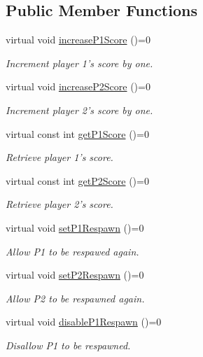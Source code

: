 \subsection*{Public Member Functions}
\begin{DoxyCompactItemize}
\item 
virtual void \hyperlink{classGameStateData_a28ec2cf2d7dd89bab394b611a83e7d4c}{increase\-P1\-Score} ()=0
\begin{DoxyCompactList}\small\item\em Increment player 1's score by one. \end{DoxyCompactList}\item 
virtual void \hyperlink{classGameStateData_a8b2470bafedd2c51cdc32199ae004b13}{increase\-P2\-Score} ()=0
\begin{DoxyCompactList}\small\item\em Increment player 2's score by one. \end{DoxyCompactList}\item 
virtual const int \hyperlink{classGameStateData_ac4dbf8f19eb4abae6c6e674e1f0ad473}{get\-P1\-Score} ()=0
\begin{DoxyCompactList}\small\item\em Retrieve player 1's score. \end{DoxyCompactList}\item 
virtual const int \hyperlink{classGameStateData_a024affaa547433a0feca091d2bc516b6}{get\-P2\-Score} ()=0
\begin{DoxyCompactList}\small\item\em Retrieve player 2's score. \end{DoxyCompactList}\item 
virtual void \hyperlink{classGameStateData_ab8f2d792862e1292c767d5c1b41eb334}{set\-P1\-Respawn} ()=0
\begin{DoxyCompactList}\small\item\em Allow P1 to be respawed again. \end{DoxyCompactList}\item 
virtual void \hyperlink{classGameStateData_a3b47e49a56e053a7b346b1eafd5c46b1}{set\-P2\-Respawn} ()=0
\begin{DoxyCompactList}\small\item\em Allow P2 to be respawned again. \end{DoxyCompactList}\item 
virtual void \hyperlink{classGameStateData_a0599750aaaa0d272ba8e073d84b0e82b}{disable\-P1\-Respawn} ()=0
\begin{DoxyCompactList}\small\item\em Disallow P1 to be respawned. \end{DoxyCompactList}\item 

\end{DoxyCompactItemize}
